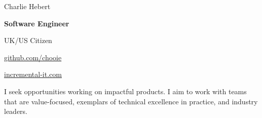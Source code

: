 \begin{center}
  {\Huge Charlie Hebert}

  \textbf{Software Engineer}

  UK/US Citizen
\end{center}

\begin{small}

\noindent
\begin{minipage}[t]{0.5\textwidth}
\end{minipage}
\noindent
\noindent
\begin{minipage}[t]{0.5\textwidth}
  \begin{description}
    \raggedleft
    \item[My code] \href{http://www.github.com/chooie}{github.com/chooie}
    \item[Website]
      \href{http://incremental-it.com}{incremental-it.com}
  \end{description}
\end{minipage}
\noindent

\end{small}

\begin{center}
  I seek opportunities working on impactful products. I aim to work with teams
  that are value-focused, exemplars of technical excellence in practice, and
  industry leaders.

\end{center}

